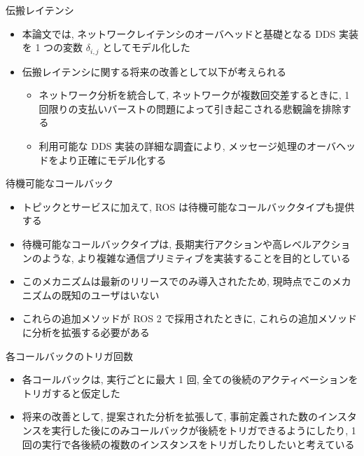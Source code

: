 \begin{frame}{伝搬レイテンシ}
    \begin{itemize}
        \item 本論文では, ネットワークレイテンシのオーバヘッドと基礎となる DDS 実装を 1 つの変数 $\delta_{i, j}$ としてモデル化した
        \item 伝搬レイテンシに関する将来の改善として以下が考えられる
              \begin{itemize}
                  \item ネットワーク分析を統合して, ネットワークが複数回交差するときに, 1 回限りの支払いバーストの問題によって引き起こされる悲観論を排除する
                  \item 利用可能な DDS 実装の詳細な調査により, メッセージ処理のオーバヘッドをより正確にモデル化する
              \end{itemize}
    \end{itemize}
\end{frame}

\begin{frame}{待機可能なコールバック}
    \begin{itemize}
        \item トピックとサービスに加えて, ROS は待機可能なコールバックタイプも提供する
        \item 待機可能なコールバックタイプは, 長期実行アクションや高レベルアクションのような, より複雑な通信プリミティブを実装することを目的としている
        \item このメカニズムは最新のリリースでのみ導入されたため, 現時点でこのメカニズムの既知のユーザはいない
        \item これらの追加メソッドが ROS 2 で採用されたときに, これらの追加メソッドに分析を拡張する必要がある
    \end{itemize}
\end{frame}

\begin{frame}{各コールバックのトリガ回数}
    \begin{itemize}
        \item 各コールバックは, 実行ごとに最大 1 回, 全ての後続のアクティベーションをトリガすると仮定した
        \item 将来の改善として, 提案された分析を拡張して, 事前定義された数のインスタンスを実行した後にのみコールバックが後続をトリガできるようにしたり, 1 回の実行で各後続の複数のインスタンスをトリガしたりしたいと考えている
    \end{itemize}
\end{frame}

